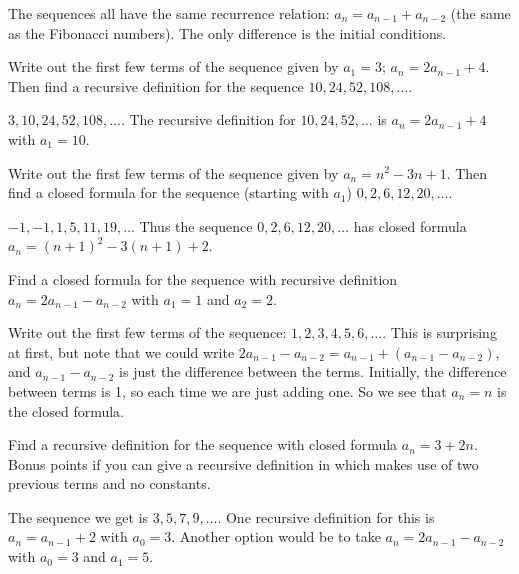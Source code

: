\begin{questions}

	\begin{answer}
		The sequences all have the same recurrence relation: $a_n = a_{n-1} + a_{n-2}$ (the same as the Fibonacci numbers).  The only difference is the initial conditions.
	\end{answer}
	


\question Write out the first few terms of the sequence given by $a_1 = 3$; $a_n = 2a_{n-1} + 4$.  Then find a recursive definition for the sequence $10, 24, 52, 108, \ldots$.

	\begin{answer}
		$3, 10, 24, 52, 108,\ldots$.  The recursive definition for $10, 24, 52, \ldots$ is $a_n = 2a_{n-1} + 4$ with $a_1 = 10$.
	\end{answer}
	
	
	


\question Write out the first few terms of the sequence given by $a_n = n^2 - 3n + 1$.  Then find a closed formula for the sequence (starting with $a_1$) $0, 2, 6, 12, 20, \ldots$.

	\begin{answer}
		$-1, -1, 1, 5, 11, 19,\ldots$  Thus the sequence $0, 2, 6, 12, 20,\ldots$ has closed formula $a_n = (n+1)^2 - 3(n+1) + 2$.
	\end{answer}
	
	
\question Find a closed formula for the sequence with recursive definition $a_n = 2a_{n-1} - a_{n-2}$ with $a_1 = 1$ and $a_2 = 2$.

	\begin{answer}
		Write out the first few terms of the sequence: $1, 2, 3, 4, 5, 6,\ldots$.  This is surprising at first, but note that we could write $2a_{n-1} - a_{n-2} = a_{n-1} + (a_{n-1} -a_{n-2})$, and $a_{n-1} - a_{n-2}$ is just the difference between the terms.  Initially, the difference between terms is 1, so each time we are just adding one.  So we see that $a_n = n$ is the closed formula.  
	\end{answer}
	

\question Find a recursive definition for the sequence with closed formula $a_n = 3 + 2n$.  Bonus points if you can give a recursive definition in which makes use of two previous terms and no constants.

	\begin{answer}
		The sequence we get is $3, 5, 7, 9, \ldots$.  One recursive definition for this is $a_n = a_{n-1} + 2$ with $a_0 = 3$.  Another option would be to take $a_n = 2a_{n-1} - a_{n-2}$ with $a_0 = 3$ and $a_1 = 5$.
	\end{answer}
	
\end{questions}